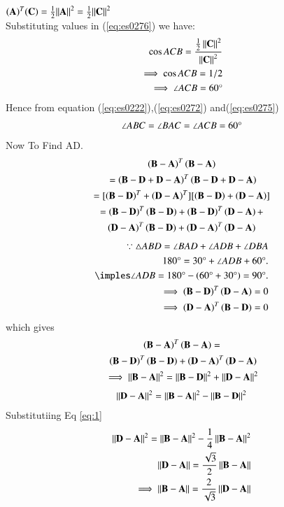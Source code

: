 \documentclass[journal,12pt,twocolumn]{IEEEtran}
\begin{document}
$(\mathbf{A})^T(\mathbf{C})= \frac{1}{2}{\left\lVert\mathbf{A}\right\rVert^2}=\frac{1}{2}{\left\lVert\mathbf{C}\right\rVert^2}$\\
Substituting values in (\ref{eq:es0276}) we have:
\begin{align}
\cos {ACB}=
     \frac{{\frac{1}{2}\left\lVert\mathbf{C}\right\rVert^2}}{\left\lVert\mathbf{C}\right\rVert^2}\nonumber\\
     \implies \cos{ACB} = 1/2\nonumber\\
\implies \angle {ACB = 60} \degree
\end{align}
Hence from  equation (\ref{eq:es0222}),(\ref{eq:es0272}) and(\ref{eq:es0275})
\begin{align}
\angle {ABC} =\angle {BAC}=\angle {ACB}=60\degree
    \end{align}
Now To Find AD.
\begin{multline}
 \left(\mathbf{B-A}\right)^{T}\left(\mathbf{B-A}\right)\\\ =\left(\mathbf{B-D+D-A}\right)^{T}\left(\mathbf{B-D+D-A}\right)\\
 = [\left(\mathbf{B-D}\right)^{T}+\left(\mathbf{D-A}\right)^{T}][\left(\mathbf{B-D}\right)+\left(\mathbf{D-A}\right)]\\
 =\left(\mathbf{B-D}\right)^{T}\left(\mathbf{B-D}\right) + \left(\mathbf{B-D}\right)^{T}\left(\mathbf{D-A}\right) +\\ \left(\mathbf{D-A}\right)^{T}\left(\mathbf{B-D}\right) + \left(\mathbf{D-A}\right)^{T}\left(\mathbf{D-A}\right)
\end{multline}
\begin{align}
\because \triangle ABD = \angle BAD + \angle ADB + \angle DBA\\
180\degree = 30\degree + \angle ADB + 60\degree.\\
\imples \angle ADB = 180\degree -\brak{60\degree + 30\degree} = 90\degree.\\
  \implies\brak{\vec{B-D}}^{T}\brak{\vec{D-A}}=0\\ \implies\brak{\vec{D-A}}^{T}\brak{\vec{B-D}} =0
\end{align}
which gives
\begin{multline}
    \left(\mathbf{B-A}\right)^{T}\left(\mathbf{B-A}\right) =\\\ \left(\mathbf{B-D}\right)^{T}\left(\mathbf{B-D}\right) + \left(\mathbf{D-A}\right)^{T}\left(\mathbf{D-A}\right)\\
    \implies\left\lVert\mathbf{B-A}\right\rVert^2=\left\lVert\mathbf{B-D}\right\rVert^2 + \left\lVert\mathbf{D-A}\right\rVert^2
\end{multline} 
\begin{align}
  \left\lVert\mathbf{D-A}\right\rVert^2=\left\lVert\mathbf{B-A}\right\rVert^2-\left\lVert\mathbf{B-D}\right\rVert^2\label{eq:5}
\end{align}
Substitutiing  Eq \eqref{eq:1}
\begin{align}
\left\lVert\mathbf{D-A}\right\rVert^2=\left\lVert\mathbf{B-A}\right\rVert^2-\frac{1}{4}\left\lVert\mathbf{B-A}\right\rVert^2\label{eq:24}\\
 \left\lVert\mathbf{D-A}\right\rVert=\frac{\sqrt{3}}{2}\left\lVert\mathbf{B-A}\right\rVert\\
  \implies\left\lVert\mathbf{B-A}\right\rVert = \frac{2}{\sqrt{3}}\left\lVert\mathbf{D-A}\right\rVert\label{eq:6}
\end{align}
\end{document}
